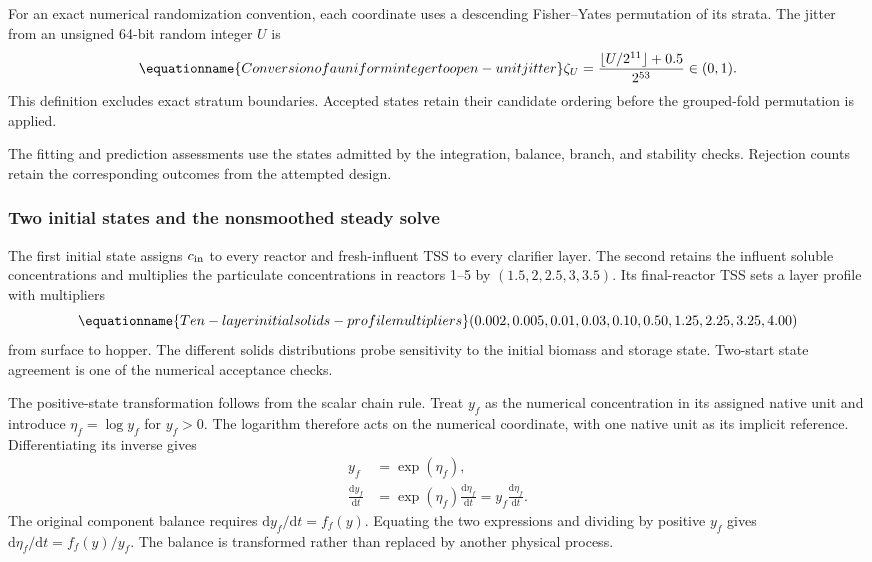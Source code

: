 For an exact numerical randomization convention, each coordinate uses a descending Fisher--Yates permutation of its strata. The jitter from an unsigned 64-bit random integer $U$ is
\begin{equation}
\equationname{Conversion of a uniform integer to open-unit jitter}
\zeta_U=\frac{\lfloor U/2^{11}\rfloor+0.5}{2^{53}}\in(0,1).
\end{equation}
This definition excludes exact stratum boundaries. Accepted states retain their candidate ordering before the grouped-fold permutation is applied.

The fitting and prediction assessments use the states admitted by the integration, balance, branch, and stability checks. Rejection counts retain the corresponding outcomes from the attempted design.

\subsubsection{Two initial states and the nonsmoothed steady solve}

The first initial state assigns $c_{\rm in}$ to every reactor and fresh-influent TSS to every clarifier layer. The second retains the influent soluble concentrations and multiplies the particulate concentrations in reactors 1--5 by $(1.5,2,2.5,3,3.5)$. Its final-reactor TSS sets a layer profile with multipliers
\begin{equation}
\equationname{Ten-layer initial solids-profile multipliers}
(0.002,0.005,0.01,0.03,0.10,0.50,1.25,2.25,3.25,4.00)
\label{eq:plant_initial_layer_multipliers}
\end{equation}
from surface to hopper. The different solids distributions probe sensitivity to the initial biomass and storage state. Two-start state agreement is one of the numerical acceptance checks.

The positive-state transformation follows from the scalar chain rule. Treat $y_f$ as the numerical concentration in its assigned native unit and introduce $\eta_f=\log y_f$ for $y_f>0$. The logarithm therefore acts on the numerical coordinate, with one native unit as its implicit reference. Differentiating its inverse gives
\[
\begin{aligned}
y_f&=\exp(\eta_f),\\
\frac{\mathrm d y_f}{\mathrm dt}
&=\exp(\eta_f)\frac{\mathrm d\eta_f}{\mathrm dt}
=y_f\frac{\mathrm d\eta_f}{\mathrm dt}.
\end{aligned}
\]
The original component balance requires $\mathrm d y_f/\mathrm dt=f_f(y)$. Equating the two expressions and dividing by positive $y_f$ gives $\mathrm d\eta_f/\mathrm dt=f_f(y)/y_f$. The balance is transformed rather than replaced by another physical process.

